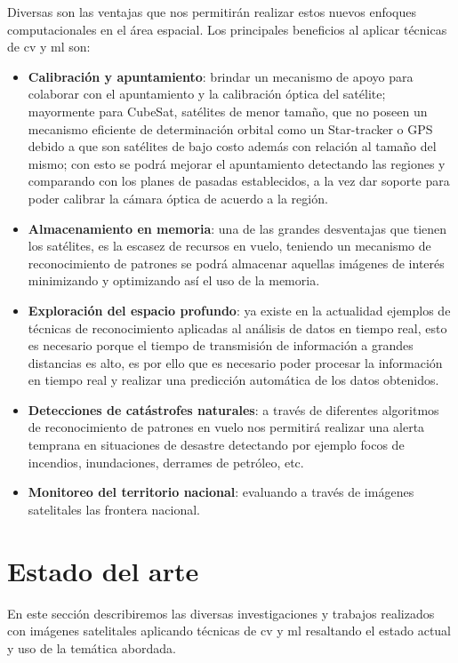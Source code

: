 Diversas son las ventajas que nos permitirán realizar estos nuevos enfoques computacionales en el área espacial. Los principales beneficios al aplicar técnicas de \ac{cv} y \ac{ml} son: 
\begin{itemize}
\item \textbf{Calibración y apuntamiento}: brindar un mecanismo de apoyo para colaborar con el apuntamiento y la calibración óptica del satélite; mayormente para CubeSat, satélites de menor tamaño, que no poseen un mecanismo eficiente de determinación orbital como un Star-tracker o GPS debido a que son satélites de bajo costo además con relación al tamaño del mismo; con esto se podrá mejorar el apuntamiento detectando las regiones y comparando con los planes de pasadas  establecidos, a la vez dar soporte para poder calibrar la cámara óptica de acuerdo a la región.
\item \textbf{Almacenamiento en memoria}: una de las grandes desventajas que tienen los satélites, es la escasez de recursos en vuelo, teniendo un mecanismo de reconocimiento de patrones se podrá almacenar aquellas imágenes de interés minimizando y optimizando  así el uso de la memoria.
\item \textbf{Exploración del espacio profundo}: ya existe en la actualidad ejemplos de técnicas de reconocimiento aplicadas al análisis de datos en tiempo real, esto es necesario  porque el tiempo de transmisión de información a grandes distancias es alto, es por ello que es necesario poder procesar la información en tiempo real y realizar una predicción automática de los datos obtenidos.
\item \textbf{Detecciones de catástrofes naturales}: a través de diferentes algoritmos de reconocimiento de patrones en vuelo nos permitirá realizar una alerta temprana en situaciones de desastre detectando por ejemplo focos de incendios, inundaciones, derrames de petróleo, etc.
\item \textbf{Monitoreo del territorio nacional}: evaluando a través de imágenes satelitales las frontera nacional.
\end{itemize}

\section{Estado del arte} \label{sec:estadodelarte}

En este sección describiremos las diversas investigaciones y trabajos realizados con imágenes satelitales aplicando técnicas de \ac{cv} y \ac{ml} resaltando el estado actual y uso de la temática abordada.


